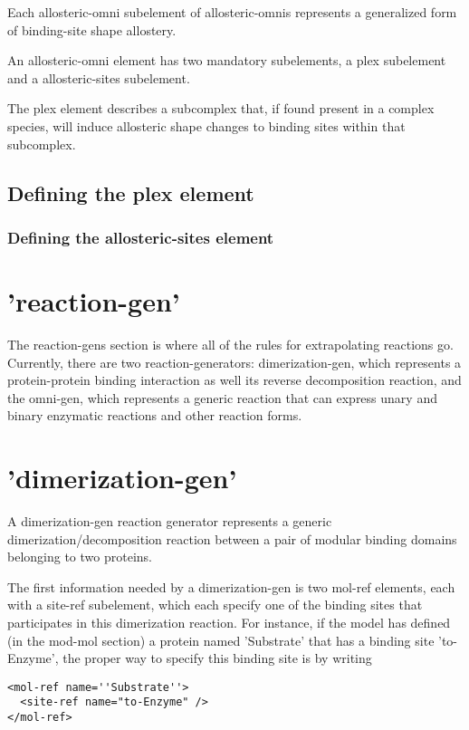 Each allosteric-omni subelement of allosteric-omnis represents a
generalized form of binding-site shape allostery.  

An allosteric-omni element has two mandatory subelements, a plex
subelement and a allosteric-sites subelement.

The plex element describes a subcomplex that, if found present in a
complex species, will induce allosteric shape changes to binding sites
within that subcomplex.  

\subsection{Defining the plex element}

\subsubsection{Defining the allosteric-sites element}



\section{'reaction-gen'}

The reaction-gens section is where all of the rules for extrapolating
reactions go.  Currently, there are two
reaction-generators: dimerization-gen, which represents a
protein-protein binding interaction as well its reverse decomposition
reaction, and the omni-gen, which represents a generic reaction that
can express unary and binary enzymatic reactions and other reaction
forms.  

\section{'dimerization-gen'}
A dimerization-gen reaction generator represents a generic
dimerization/decomposition reaction between a pair of modular binding
domains belonging to two proteins.  

The first information needed by a dimerization-gen is two mol-ref
elements, each with a site-ref subelement, which each specify one of
the binding sites that participates in this dimerization reaction.
For instance, if the model has defined (in the mod-mol section) a
protein named 'Substrate' that has a binding site 'to-Enzyme', the
proper way to specify this binding site is by writing 

\begin{lstlisting}
<mol-ref name=''Substrate''>
  <site-ref name="to-Enzyme" />
</mol-ref>
\end{lstlisting}


